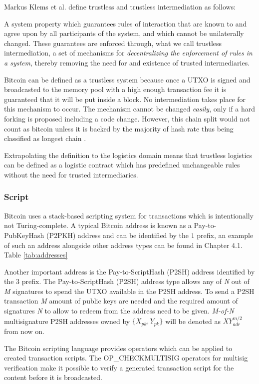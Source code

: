Markus Klems et al. define trustless and trustless intermediation as follows:

\begin{displayquote}
   A system property which guarantees rules of interaction that are known to and agree upon by all participants of the system, and which cannot be unilaterally changed. These guarantees are enforced through, what we call trustless intermediation, a set of mechanisms for \textit{decentralizing the enforcement of rules in a system}, thereby removing the need for and existence of trusted intermediaries. \cite{trustlessIntermediationInBCServiceMarket}
\end{displayquote}

Bitcoin can be defined as a trustless system because once a UTXO is signed and broadcasted to the memory pool with a high enough transaction fee it is guaranteed that it will be put inside a block. No intermediation takes place for this mechanism to occur. The mechanism cannot be changed \textit{easily}, only if a hard forking is proposed including a code change. However, this chain split would not count as bitcoin unless it is backed by the majority of hash rate thus being classified as longest chain \cite{nakamoto2008bitcoin}. \par
Extrapolating the definition to the logistics domain means that trustless logistics can be defined as a logistic contract which has predefined unchangeable rules without the need for trusted intermediaries.

\subsubsection{Script}

Bitcoin uses a stack-based scripting system for transactions which is intentionally not Turing-complete. A typical Bitcoin address is known as a Pay-to-PubKeyHash (P2PKH) address and can be identified by the $1$ prefix, an example of such an address alongside other address types can be found in Chapter 4.1. Table \ref{tab:addresses}\par
Another important address is the Pay-to-ScriptHash (P2SH) address identified by the $3$ prefix. The Pay-to-ScriptHash (P2SH) address type allows any of \textit{N} out of \textit{M} signatures to spend the UTXO available in the P2SH address. To send a P2SH transaction \textit{M} amount of public keys are needed and the required amount of signatures \textit{N} to allow to redeem from the address need to be given. \textit{M-of-N} multisignature P2SH addresses owned by $\{X_{pk}, Y_{pk}\}$ will be denoted as \(XY_{adr}^{m/2}\) from now on. \par
The Bitcoin scripting language provides operators which can be applied to created transaction scripts. The OP\_CHECKMULTISIG operators for multisig verification make it possible to verify a generated transaction script for the content before it is broadcasted. \par

